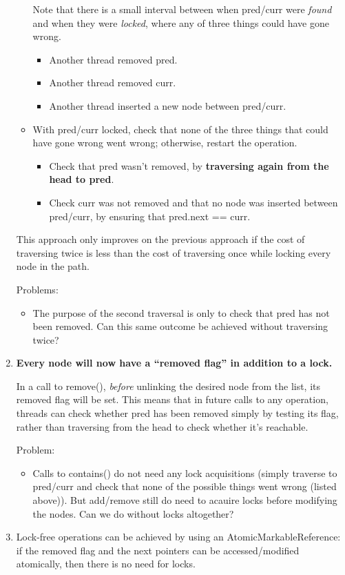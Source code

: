 \begin{enumerate}
\begin{itemize}
        Note that there is a small interval between when pred/curr were \textit{found} and when they were \textit{locked}, where any of three things could have gone wrong.
        \begin{itemize}
            \item Another thread removed pred.
            \item Another thread removed curr.
            \item Another thread inserted a new node between pred/curr.
        \end{itemize}

        \item With pred/curr locked, check that none of the three things that could have gone wrong went wrong; otherwise, restart the operation.
        \begin{itemize}
            \item Check that pred wasn't removed, by \textbf{traversing again from the head to pred}.
            \item Check curr was not removed and that no node was inserted between pred/curr, by ensuring that pred.next == curr.
        \end{itemize}
    \end{itemize}

    This approach only improves on the previous approach if the cost of traversing twice is less than the cost of traversing once while locking every node in the path.

    Problems:
    \begin{itemize}
        \item The purpose of the second traversal is only to check that pred has not been removed. Can this same outcome be achieved without traversing twice?
    \end{itemize}

    \item \textbf{Every node will now have a ``removed flag'' in addition to a lock.}
    
    In a call to remove(), \textit{before} unlinking the desired node from the list, its removed flag will be set. This means that in future calls to any operation, threads can check whether pred has been removed simply by testing its flag, rather than traversing from the head to check whether it's reachable.

    Problem:
    \begin{itemize}
        \item Calls to contains() do not need any lock acquisitions (simply traverse to pred/curr and check that none of the possible things went wrong (listed above)). But add/remove still do need to acauire locks before modifying the nodes. Can we do without locks altogether?
    \end{itemize}

    \item Lock-free operations can be achieved by using an AtomicMarkableReference: if the removed flag and the next pointers can be accessed/modified atomically, then there is no need for locks.
\end{enumerate}
